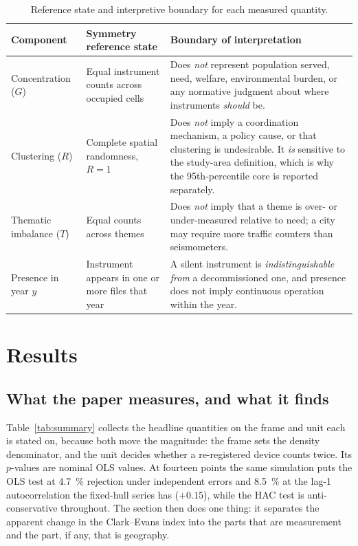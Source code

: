 \documentclass[fleqn,10pt,lineno]{wlpeerj}
\newcommand{\olsSizeIid}{4.7}
\newcommand{\olsSizeAr}{8.5}
\begin{document}
\begin{table}[htbp]
\centering
\caption{Reference state and interpretive boundary for each measured quantity.}
\label{tab:boundaries}
\footnotesize
\setlength{\tabcolsep}{4pt}
\begin{tabular}{p{2.2cm}p{3.4cm}p{6.9cm}}
\toprule
Component & Symmetry reference state & Boundary of interpretation \\
\midrule
\noindent Concentration ($G$) & Equal instrument counts across occupied cells &
Does \emph{not} represent population served, need, welfare, environmental burden, or
any normative judgment about where instruments \emph{should} be. \\
\addlinespace
\noindent Clustering ($R$) & Complete spatial randomness, $R = 1$ &
Does \emph{not} imply a coordination mechanism, a policy cause, or that clustering is
undesirable. It \emph{is} sensitive to the study-area definition, which is why the
95th-percentile core is reported separately. \\
\addlinespace
\noindent Thematic imbalance ($T$) & Equal counts across themes &
Does \emph{not} imply that a theme is over- or under-measured relative to need; a city
may require more traffic counters than seismometers. \\
\addlinespace
\noindent Presence in year $y$ & Instrument appears in one or more files that year &
A silent instrument is \emph{indistinguishable from} a decommissioned one, and presence
does not imply continuous operation within the year. \\
\bottomrule
\end{tabular}
\end{table}

\section*{Results}
\label{sec:results}

\subsection*{What the paper measures, and what it finds}
\label{sec:results-summary}

Table~\ref{tab:summary} collects the headline quantities on the frame and unit each is stated
on, because both move the magnitude: the frame sets the density denominator, and the unit decides
whether a re-registered device counts twice. Its $p$-values are nominal OLS values. At fourteen
points the same simulation puts the OLS test at \SI{\olsSizeIid}{\percent} rejection under
independent errors and \SI{\olsSizeAr}{\percent} at the lag-1 autocorrelation the fixed-hull
series has ($+0.15$), while the HAC test is anti-conservative throughout. The section then does
one thing: it separates the apparent change in the Clark--Evans index
into the parts that are measurement and the part, if any, that is geography.
\end{document}
